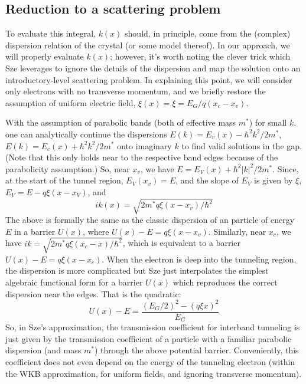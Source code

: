 \subsection{Reduction to a scattering problem}
To evaluate this integral, $k(x)$ should, in principle, come from the (complex) dispersion relation of the crystal (or some model thereof).  In our approach, we will properly evaluate $k(x)$; however, it's worth noting the clever trick which Sze leverages to ignore the details of the dispersion and map the solution onto an introductory-level scattering problem.  In explaining this point, we will consider only electrons with no transverse momentum, and we briefly restore the assumption of uniform electric field, $\xi(x)=\xi=E_G/q(x_c-x_v)$.

With the assumption of parabolic bands (both of effective mass $m^*$) for small $k$, one can  analytically continue the dispersions $E(k)=E_v(x)-\hbar^2k^2/2m^*$, $E(k)=E_c(x)+\hbar^2k^2/2m^*$ onto imaginary $k$ to find valid solutions in the gap.  (Note that this only holds near to the respective band edges because of the parabolicity assumption.)  So, near $x_v$, we have $E=E_V(x)+\hbar^2|k|^2/2m^*$.  Since, at the start of the tunnel region, $E_V(x_v)=E$, and the slope of $E_V$ is given by $\xi$, $E_V=E-q\xi(x-x_V)$, and
$$ik(x)=\sqrt{2m^*q\xi(x-x_v)/\hbar^2}$$
The above is formally the same as the classic dispersion of an particle of energy $E$ in a barrier $U(x)$, where $U(x)-E=q\xi(x-x_v)$.  Similarly, near $x_c$, we have $ik=\sqrt{2m^*q\xi(x_c-x)/\hbar^2}$, which is equivalent to a barrier $U(x)-E=q\xi(x-x_c)$.  When the electron is deep into the tunneling region, the dispersion is more complicated but Sze just interpolates the simplest algebraic functional form for a barrier $U(x)$ which reproduces the correct dispersion near the edges.  That is the quadratic:
$$U(x)-E=\frac{(E_G/2)^2-(q\xi x)^2}{E_G}$$
So, in Sze's approximation, the transmission coefficient for interband tunneling is just given by the transmission coefficient of a particle with a familiar parabolic dispersion (and mass $m^*$) through the above potential barrier.  Conveniently, this coefficient does not even depend on the energy of the tunneling electron (within the WKB approximation, for uniform fields, and ignoring transverse momentum).